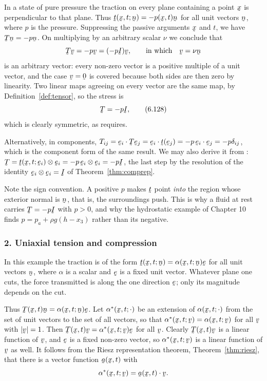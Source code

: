 In a state of pure pressure the traction on every plane containing a
point $\bx$ is perpendicular to that plane. Thus
$\bt(\bx,t;\bn)=-p(\bx,t)\bn$ for all unit vectors $\bn$, where $p$ is
the pressure. Suppressing the passive arguments $\bx$ and $t$, we have
$\bT\bn=-p\bn$. On multiplying by an arbitrary scalar $\nu$ we conclude
that
\[
   \bT\bv=-p\bv=(-p\I)\bv ,
   \qquad\text{in which}\quad \bv=\nu\bn
\]
is an arbitrary vector: every non-zero vector is a positive multiple of
a unit vector, and the case $\bv=\bze$ is covered because both sides
are then zero by linearity. Two linear maps agreeing on every vector
are the same map, by Definition~\ref{def:tensor}, so the stress is
\begin{equation}
   \bT=-p\I ,
   \tag{6.128}\label{eq:6.128}
\end{equation}
which is clearly symmetric, as  requires.

Alternatively, in components,
$T_{ij}=\ip{\be_{i}}{\bT\be_{j}}=\ip{\be_{i}}{\bt(\be_{j})}
=-p\,\ip{\be_{i}}{\be_{j}}=-p\dd_{ij}$, which is the component form of
the same result. We may also derive it from :
$\bT=\bt(\bx,t;\be_{i})\otimes\be_{i}=-p\,\be_{i}\otimes\be_{i}
=-p\I$, the last step by the resolution of the identity
$\be_{i}\otimes\be_{i}=\I$ of Theorem~\ref{thm:comprep}.

Note the sign convention. A positive $p$ makes $\bt$ point \emph{into}
the region whose exterior normal is $\bn$, that is, the surroundings
push. This is why a fluid at rest carries $\bT=-p\I$ with $p>0$, and
why the hydrostatic example of Chapter 10 finds
$p=p_{a}+\rho g(h-x_{3})$ rather than its negative.

\subsubsection*{2. Uniaxial tension and compression}

In this example the traction is of the form
$\bt(\bx,t;\bn)=\alpha(\bx,t;\bn)\be$ for all unit vectors $\bn$, where
$\alpha$ is a scalar and $\be$ is a fixed unit vector. Whatever plane
one cuts, the force transmitted is along the one direction $\be$; only
its magnitude depends on the cut.

Thus $\bT(\bx,t)\bn=\alpha(\bx,t;\bn)\be$. Let $\alpha^{*}(\bx,t;\cdot)$
be an extension of $\alpha(\bx,t;\cdot)$ from the set of unit vectors
to the set of all vectors, so that $\alpha^{*}(\bx,t;\bv)
=\alpha(\bx,t;\bv)$ for all $\bv$ with $|\bv|=1$. Then
$\bT(\bx,t)\bv=\alpha^{*}(\bx,t;\bv)\be$ for all $\bv$. Clearly
$\bT(\bx,t)\bv$ is a linear function of $\bv$, and $\be$ is a fixed
non-zero vector, so $\alpha^{*}(\bx,t;\bv)$ is a linear function of
$\bv$ as well. It follows from the Riesz representation theorem,
Theorem~\ref{thm:riesz}, that there is a vector function $\ba(\bx,t)$
with
\[
   \alpha^{*}(\bx,t;\bv)=\ip{\ba(\bx,t)}\bv .
\]

